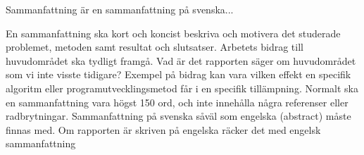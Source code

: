 Sammanfattning är en sammanfattning på svenska...

En sammanfattning ska kort och koncist beskriva och motivera det studerade problemet,
metoden samt resultat och slutsatser. Arbetets bidrag till huvudområdet ska tydligt framgå.
Vad är det rapporten säger om huvudområdet som vi inte visste tidigare? Exempel på
bidrag kan vara vilken effekt en specifik algoritm eller programutvecklingsmetod får i en
specifik tillämpning.
Normalt ska en sammanfattning vara högst 150 ord, och inte innehålla några referenser
eller radbrytningar.
Sammanfattning på svenska såväl som engelska (abstract) måste finnas med. Om
rapporten är skriven på engelska räcker det med engelsk sammanfattning 
